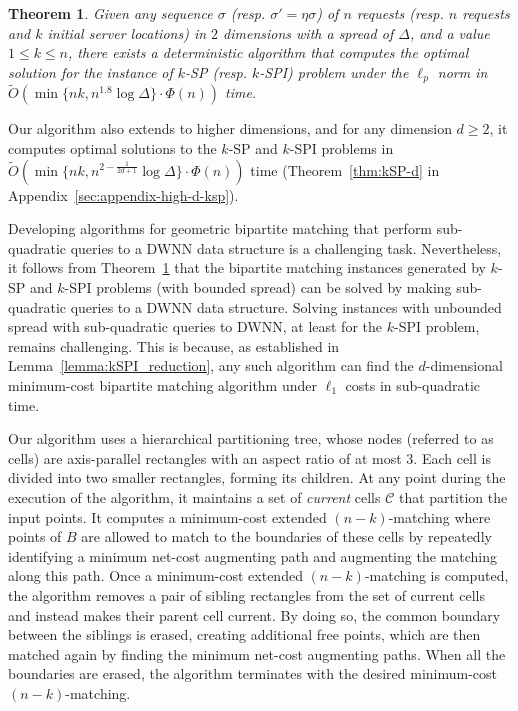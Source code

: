\documentclass[11pt,onecolumn]{article}
\def\mcC{{\mathcal{C}}}
\newcommand{\servers}{\eta}
\newcommand{\requests}{\sigma}
\newtheorem{theorem}[lemma]{Theorem}
\begin{document}
%

%

\begin{theorem}\label{thm:kSP}
Given any sequence $\requests$ (resp. $\requests'=\servers\requests$) of $n$ requests (resp. $n$ requests and $k$ initial server locations) in $2$ dimensions with a spread of $\Delta$, and a value $1 \le k \le n$, there exists a deterministic algorithm that computes the optimal solution for the instance of $k$-SP (resp. $k$-SPI) problem under the $\ell_p$ norm in $\tilde{O}(\min\{nk, n^{1.8}\log \Delta\}\cdot\Phi(n))$ time.
\end{theorem}

Our algorithm also extends to higher dimensions, and for any dimension $d\ge 2$, it computes optimal solutions to the $k$-SP and $k$-SPI problems in $\tilde{O}(\min\{nk, n^{2-\frac{1}{2d+1}}\log \Delta\}\cdot\Phi(n))$ time (Theorem~\ref{thm:kSP-d} in Appendix~\ref{sec:appendix-high-d-ksp}). 
%

%

%
%
%


Developing algorithms for geometric bipartite matching that perform sub-quadratic queries to a DWNN data structure is a challenging task. Nevertheless, it follows from Theorem~\ref{thm:kSP} that the bipartite matching instances generated by $k$-SP and $k$-SPI problems (with bounded spread) can be solved by making sub-quadratic queries to a DWNN data structure. Solving instances with unbounded spread with sub-quadratic queries to DWNN, at least for the $k$-SPI problem, remains challenging. This is because, as established in Lemma~\ref{lemma:kSPI_reduction}, any such  
algorithm can find the $d$-dimensional minimum-cost bipartite matching algorithm under $\ell_1$ costs in sub-quadratic time.  

%
%
%
%

Our algorithm uses a hierarchical partitioning tree, whose nodes (referred to as cells) are axis-parallel rectangles with an aspect ratio of at most $3$. Each cell is divided into two smaller rectangles, forming its children. At any point during the execution of the algorithm, it maintains a set of \emph{current} cells $\mcC$ that partition the input points. It computes a minimum-cost extended $(n-k)$-matching where points of $B$ are allowed to match to the boundaries of these cells by repeatedly identifying a minimum net-cost augmenting path and augmenting the matching along this path.  Once a minimum-cost extended $(n-k)$-matching is computed, the algorithm removes a pair of sibling rectangles from the set of current cells and instead makes their parent cell current. By doing so, the common boundary between the siblings is erased, creating additional free points, which are then matched again by finding the minimum net-cost augmenting paths. When all the boundaries are erased, the algorithm terminates with the desired minimum-cost $(n-k)$-matching. 
\end{document}
